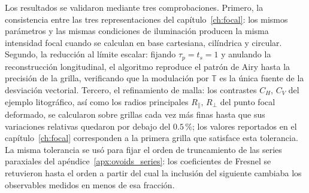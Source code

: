 Los resultados se validaron mediante tres comprobaciones. Primero, la
consistencia entre las tres representaciones del capítulo~\ref{ch:focal}:
los mismos parámetros y las mismas condiciones de iluminación producen la
misma intensidad focal cuando se calculan en base cartesiana, cilíndrica y
circular. Segundo, la reducción al límite escalar: fijando
$\tau_p=t_s=1$ y anulando la reconstrucción longitudinal, el algoritmo
reproduce el patrón de Airy hasta la precisión de la grilla, verificando
que la modulación por $\mathbb T$ es la única fuente de la desviación
vectorial. Tercero, el refinamiento de malla: los contrastes
$C_H,\,C_V$ del ejemplo litográfico, así como los radios principales
$R_\parallel,\,R_\perp$ del punto focal deformado, se calcularon sobre
grillas cada vez más finas hasta que sus variaciones relativas quedaron por
debajo del $0.5\,\%$; los valores reportados en el capítulo~\ref{ch:focal}
corresponden a la primera grilla que satisface esta tolerancia. La misma
tolerancia se usó para fijar el orden de truncamiento de las series
paraxiales del apéndice~\ref{apx:ovoids_series}: los coeficientes de
Fresnel se retuvieron hasta el orden a partir del cual la inclusión del
siguiente cambiaba los observables medidos en menos de esa fracción.
